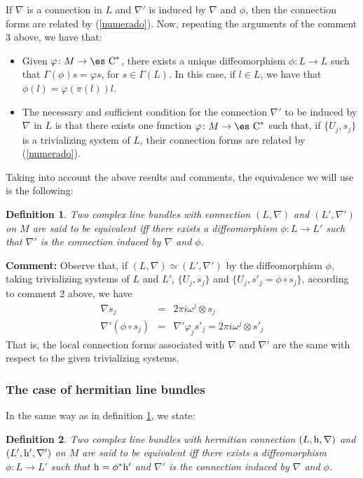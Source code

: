 \documentclass[12pt]{article}
\theoremstyle{plain}
\newtheorem{definition}{Definition}
\def\beann{\begin{eqnarray*}}
\def\eeann{\end{eqnarray*}}
\def\h{{\rm h}}
\def\Complex{\mbox{\es C}}
\begin{document}
\begin{enumerate}
If $\nabla$ is a connection in $L$ and
$\nabla '$ is induced by $\nabla$ and $\phi$,
then the connection forms are related by (\ref{numerado}).
Now, repeating the arguments of the comment 3 above, we have that:
\begin{itemize}
\item
Given $\varphi \colon M \to \Complex^*$,
there exists a unique diffeomorphism
$\phi \colon L \to L$
such that $\Gamma (\phi )s = \varphi s$,
for $s \in \Gamma (L)$.
In this case, if $l \in L$,
we have that $\phi (l) = \varphi (\pi (l))l$.
\item
The necessary and sufficient condition for
the connection $\nabla '$ to be induced by
$\nabla$ in $L$ is that there exists one function
$\varphi \colon M \to \Complex^*$
such that, if $\{ U_j,s_j \}$ is a trivializing system of $L$,
their connection forms are related by (\ref{numerado}).
\end{itemize}
\end{enumerate}

Taking into account the above results and comments,
the equivalence we will use is the following:

\begin{definition}
Two complex line bundles with connection
$(L,\nabla )$ and $(L',\nabla ')$ on $M$
are said to be
{\rm equivalent}
iff there exists a diffeomorphism
$\phi \colon L \to L'$
such that $\nabla '$ is the connection induced
by $\nabla$ and $\phi$.
\label{lbce}
\end{definition}

{\bf Comment:}
Observe that, if
$(L,\nabla ) \simeq (L',\nabla ')$
by the diffeomorphism $\phi$,
taking trivializing systems of $L$ and $L'$,
$\{ U_j,s_j \}$ and $\{ U_j,s'_j=\phi \circ s_j \}$,
according to comment 2 above, we have
\beann
\nabla s_j
&=&
2\pi i \omega^j \otimes s_j
\\
\nabla ' (\phi \circ s_j)
&=&
\nabla' \varphi_j s'_j = 2\pi i \omega^j \otimes s'_j
\eeann
That is, the local connection forms associated with
$\nabla$ and $\nabla '$ are the same
with respect to the given trivializing systems.


\subsubsection{The case of hermitian line bundles}


In the same way as in definition \ref{lbce}, we state:

\begin{definition}
Two complex line bundles with hermitian connection
$(L,\h ,\nabla )$ and
$(L',\h ',\nabla ')$ on $M$
are said to be {\rm equivalent}
iff there exists a diffeomorphism
$\phi \colon L \to L'$ such that
$\h = \phi^*\h '$ and $\nabla '$
is the connection induced by $\nabla$ and $\phi$.
\label{clbhc}
\end{definition}
\end{document}
